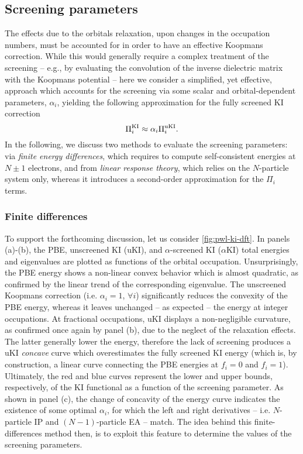 \subsection{Screening parameters\label{sec:screening-parameters}}
The effects due to the orbitals relaxation, upon changes in the occupation numbers, must be accounted for in order to have an effective Koopmans correction. While this would generally require a complex treatment of the screening -- e.g., by evaluating the convolution of the inverse dielectric matrix with the Koopmans potential -- here we consider a simplified, yet effective, approach which accounts for the screening via some scalar and orbital-dependent parameters, $\alpha_i$, yielding the following approximation for the fully screened KI correction
%
\begin{equation}
    \Pi_i^{\rm KI} \approx \alpha_i \Pi_i^{\rm uKI} .
    \label{eq:approx-screened-ki}
\end{equation}
%
In the following, we discuss two methods to evaluate the screening parameters: via \emph{finite energy differences}, which requires to compute self-consistent energies at $N \pm 1$ electrons, and from \emph{linear response theory}, which relies on the $N$-particle system only, whereas it introduces a second-order approximation for the $\Pi_i$ terms.

\subsubsection*{Finite differences}
To support the forthcoming discussion, let us consider \cref{fig:pwl-ki-dft}. In panels (a)-(b), the PBE, unscreened KI (uKI), and $\alpha$-screened KI ($\alpha$KI) total energies and eigenvalues are plotted as functions of the orbital occupation. Unsurprisingly, the PBE energy shows a non-linear convex behavior which is almost quadratic, as confirmed by the linear trend of the corresponding eigenvalue. The unscreened Koopmans correction (i.e. $\alpha_i=1$, $\forall i$) significantly reduces the convexity of the PBE energy, whereas it leaves unchanged -- as expected -- the energy at integer occupations. At fractional occupations, uKI displays a non-negligible curvature, as confirmed once again by panel (b), due to the neglect of the relaxation effects. The latter generally lower the energy, therefore the lack of screening produces a uKI \emph{concave} curve which overestimates the fully screened KI energy (which is, by construction, a linear curve connecting the PBE energies at $f_i=0$ and $f_i=1$). Ultimately, the red and blue curves represent the lower and upper bounds, respectively, of the KI functional as a function of the screening parameter. As shown in panel (c), the change of concavity of the energy curve indicates the existence of some optimal $\alpha_i$, for which the left and right derivatives -- i.e. $N$-particle IP and $(N-1)$-particle EA -- match. The idea behind this finite-differences method then, is to exploit this feature to determine the values of the screening parameters.

